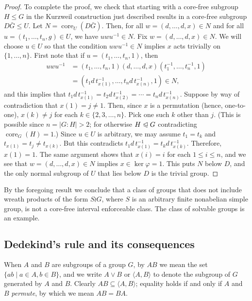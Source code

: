 \documentclass{gen-j-l}
\newcommand{\<}{\ensuremath{\langle}}
\renewcommand{\>}{\ensuremath{\rangle}}
\theoremstyle{plain}
\theoremstyle{definition}
\theoremstyle{remark}
\numberwithin{theorem}{section}
\numberwithin{claim}{section}
\numberwithin{equation}{section}
\numberwithin{conjecture}{section}
\renewcommand{\leq}{\ensuremath{\leqslant}}
\newcommand{\subnormal}{\ensuremath{\trianglelefteqslant}}
\newcommand{\join}{\ensuremath{\vee}}
\newcommand{\core}{\ensuremath{\operatorname{core}}}
\newcommand{\2}{\ensuremath{\mathbf{2}}}
\newcommand{\3}{\ensuremath{\mathbf{3}}}
\renewcommand{\phi}{\ensuremath{\varphi}}
\begin{document}
\begin{proof}
  To complete the proof, we check that starting with a core-free subgroup
  $H \leq G$ in the Kurzweil construction just described results in a
  core-free subgroup $D \bar{G} \leq U$.   Let $N = \core_U(D\bar{G})$.  Then, for all $w=(d,\dots, d, x) \in N$ and for all 
  $u = (t_1,\dots, t_n, g)\in U$, we have $u w u^{-1}\in N$. 
  Fix $w=(d,\dots, d, x) \in N$.  We will choose $u\in U$ so that
  the condition $u w u^{-1}\in N$ implies $x$ acts trivially on $\{1, \dots, n\}$.
  First note that if $u = (t_1,\dots, t_n, 1)$, then
  \begin{align*}
  u w u^{-1} &= (t_1,\dots, t_n, 1) (d, \dots, d, x) (t_1^{-1},\dots, t_n^{-1}, 1)\\
  &=(t_1 d \,t_{x(1)}^{-1},\dots, t_nd \,t_{x(n)}^{-1}, 1) \in N,
  \end{align*}
  and this implies that $t_1 d\, t_{x(1)}^{-1} = t_2 d\, t_{x(2)}^{-1} =\cdots = t_nd \,t_{x(n)}^{-1}$. 
  Suppose by way of contradiction that $x(1) = j\neq 1$.  Then, since $x$ is a
  permutation (hence, one-to-one), $x(k) \neq j$ for
  each $k\in \{2, 3, \dots, n\}$.  Pick one such $k$ other than $j$.
  (This is possible since $n = |G:H|>2$; for otherwise $H\subnormal G$
  contradicting $\core_G(H)=1$.) 
  Since $u \in U$ is arbitrary, we may assume
  $t_1 = t_k$ and $t_{x(1)}=t_j\neq t_{x(k)}$.  
  But this contradicts $t_1 d\, t_{x(1)}^{-1} = t_k d\, t_{x(k)}^{-1}$.
  Therefore, $x(1) = 1$.  The same argument shows that 
  $x(i) = i$ for each $1\leq i\leq n$, 
  and we see that
  $w=(d,\dots,d, x) \in N$ implies $x\in \ker \phi = 1$.  This puts $N$ below
  $D$, and the only normal subgroup of $U$ that lies 
  below $D$ is the trivial group.
\end{proof}
By the foregoing result we conclude that a class of groups that does
not include wreath products of the form $S\wr G$, where $S$ is an arbitrary
finite nonabelian simple group, is not a core-free interval enforceable class. 
The class of solvable groups is an example.





\subsection{Dedekind's rule and its consequences}
\label{sec:dedekinds-rule}
When $A$ and $B$ are subgroups of a group $G$, by $AB$ we mean the set
$\{ a b \mid a\in A, b\in B\}$, and we write $A \join B$ or $\<A, B\>$ to denote
the subgroup of $G$ generated by $A$ and $B$.  
Clearly $AB \subseteq \<A,B\>$; 
equality holds if and only if $A$ and $B$ \emph{permute}, by which we mean $A B = B A$.
\end{document}
